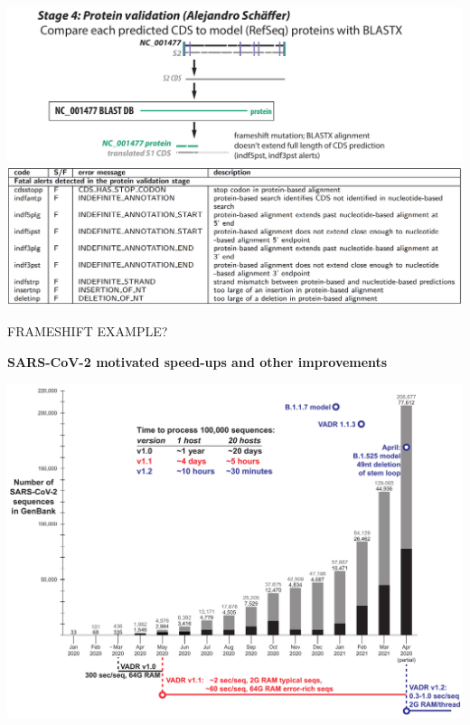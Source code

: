 \documentclass[landscape]{slides}
\begin{document}
\begin{slide}
\begin{center}

\includegraphics[width=10.5in]{figs/v-annotate-stage4-2}
\includegraphics[width=10.5in]{figs/ss-protein-alert-list}

\end{center}
\vfill
\end{slide}
\begin{slide}
\begin{center}

FRAMESHIFT EXAMPLE?

\end{center}
\vfill
\end{slide}
\begin{slide}
\begin{center}
\large{\textbf{SARS-CoV-2 motivated speed-ups and other improvements}}

\includegraphics[width=10.25in]{figs/sars-counts-jan2020-apr2021-slide6}

\end{center}

\vfill
\end{slide}
\end{document}
